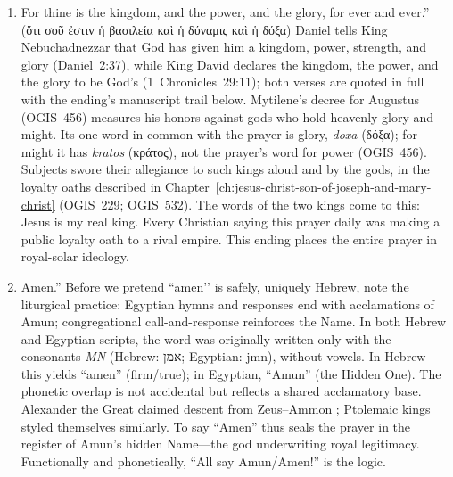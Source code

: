 \begin{enumerate}
    \item
    For thine is the kingdom, and the power, and the glory, for ever and ever.'' (ὅτι σοῦ ἐστιν ἡ βασιλεία καὶ ἡ δύναμις καὶ ἡ δόξα)
    Daniel tells King Nebuchadnezzar that God has given him a kingdom, power, strength, and glory (Daniel~2:37), while King David declares the kingdom, the power, and the glory to be God's (1~Chronicles~29:11); both verses are quoted in full with the ending's manuscript trail below.
    Mytilene's decree for Augustus (OGIS~456) measures his honors against gods who hold heavenly glory and might.
    Its one word in common with the prayer is glory, \emph{doxa} (δόξα); for might it has \emph{kratos} (κράτος), not the prayer's word for power (OGIS~456).
    Subjects swore their allegiance to such kings aloud and by the gods, in the loyalty oaths described in Chapter~\ref{ch:jesus-christ-son-of-joseph-and-mary-christ} (OGIS~229; OGIS~532).
    The words of the two kings come to this: Jesus is my real king.
    Every Christian saying this prayer daily was making a public loyalty oath to a rival empire.
    This ending places the entire prayer in royal-solar ideology.
    \item
    Amen.'' Before we pretend ``amen’’ is safely, uniquely Hebrew, note the liturgical practice: Egyptian hymns and responses end with acclamations of Amun; congregational call-and-response reinforces the Name. In both Hebrew and Egyptian scripts, the word was originally written only with the consonants \emph{MN} (Hebrew: אמן; Egyptian: jmn), without vowels. In Hebrew this yields “amen” (firm/true); in Egyptian, “Amun” (the Hidden One). The phonetic overlap is not accidental but reflects a shared acclamatory base. Alexander the Great claimed descent from Zeus--Ammon \cite[27--28]{plutarch:lives}; Ptolemaic kings styled themselves similarly. To say “Amen” thus seals the prayer in the register of Amun’s hidden Name---the god underwriting royal legitimacy. Functionally and phonetically, “All say Amun/Amen!” is the logic.
\end{enumerate}

